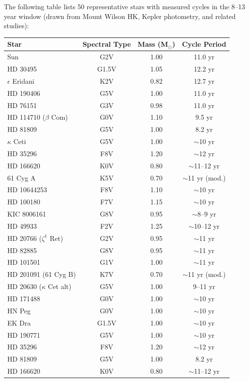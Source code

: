 \documentclass[12pt]{article}
\begin{document}
The following table lists 50 representative stars with measured cycles in the 8--13 year window (drawn from Mount Wilson HK, Kepler photometry, and related studies):
\par
\begin{table}[H]
\centering
\small
\begin{tabular}{lccc}
\toprule
Star & Spectral Type & Mass (M$_\odot$) & Cycle Period \\
\midrule
Sun & G2V & 1.00 & 11.0 yr \\
HD 30495 & G1.5V & 1.05 & 12.2 yr \\
$\epsilon$ Eridani & K2V & 0.82 & 12.7 yr \\
HD 190406 & G5V & 1.00 & 11.0 yr \\
HD 76151 & G3V & 0.98 & 11.0 yr \\
HD 114710 ($\beta$ Com) & G0V & 1.10 & 9.5 yr \\
HD 81809 & G5V & 1.00 & 8.2 yr \\
$\kappa$ Ceti & G5V & 1.00 & $\sim$10 yr \\
HD 35296 & F8V & 1.20 & $\sim$12 yr \\
HD 166620 & K0V & 0.80 & $\sim$11--12 yr \\
61 Cyg A & K5V & 0.70 & $\sim$11 yr (mod.) \\
HD 10644253 & F8V & 1.10 & $\sim$10 yr \\
HD 100180 & F7V & 1.15 & $\sim$10 yr \\
KIC 8006161 & G8V & 0.95 & $\sim$8--9 yr \\
HD 49933 & F2V & 1.25 & $\sim$10--12 yr \\
HD 20766 ($\zeta^1$ Ret) & G2V & 0.95 & $\sim$11 yr \\
HD 82885 & G8V & 0.95 & $\sim$11 yr \\
HD 101501 & G1V & 1.00 & $\sim$11 yr \\
HD 201091 (61 Cyg B) & K7V & 0.70 & $\sim$11 yr (mod.) \\
HD 20630 ($\kappa$ Cet alt) & G5V & 1.00 & 9--11 yr \\
HD 171488 & G0V & 1.00 & $\sim$10 yr \\
HN Peg & G0V & 1.00 & $\sim$10 yr \\
EK Dra & G1.5V & 1.00 & $\sim$10 yr \\
HD 190771 & G5V & 1.00 & $\sim$10 yr \\
HD 35296 & F8V & 1.20 & $\sim$12 yr \\
HD 81809 & G5V & 1.00 & 8.2 yr \\
HD 166620 & K0V & 0.80 & $\sim$11--12 yr \\

\end{tabular}
\end{table}
\end{document}
